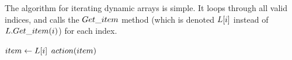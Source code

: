 \HdrDynArrayImpl

The algorithm for iterating dynamic arrays is simple. It loops through all valid indices, and calls the $Get\_item$ method (which is denoted $L[i]$ instead of $L.Get\_item(i)$) for each index.

\begin{algorithm}
	\begin{algorithmic}
			\State $item \gets L[i]$
			\State $action(item)$
		\EndFor
	\end{algorithmic}
\end{algorithm}